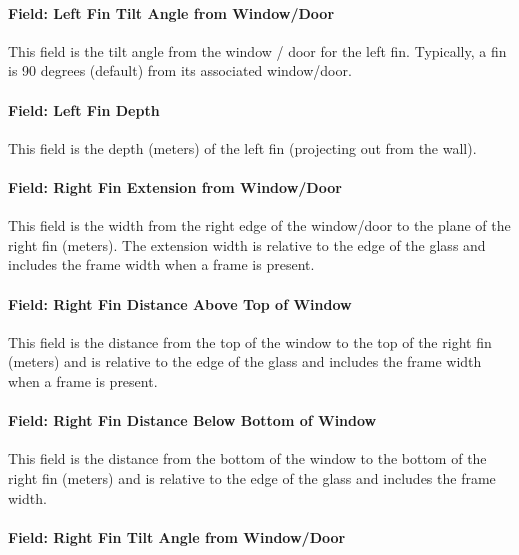 \paragraph{Field: Left Fin Tilt Angle from Window/Door}\label{field-left-fin-tilt-angle-from-windowdoor}

This field is the tilt angle from the window / door for the left fin. Typically, a fin is 90 degrees (default) from its associated window/door.

\paragraph{Field: Left Fin Depth}\label{field-left-fin-depth}

This field is the depth (meters) of the left fin (projecting out from the wall).

\paragraph{Field: Right Fin Extension from Window/Door}\label{field-right-fin-extension-from-windowdoor}

This field is the width from the right edge of the window/door to the plane of the right fin (meters). The extension width is relative to the edge of the glass and includes the frame width when a frame is present.

\paragraph{Field: Right Fin Distance Above Top of Window}\label{field-right-fin-distance-above-top-of-window}

This field is the distance from the top of the window to the top of the right fin (meters) and is relative to the edge of the glass and includes the frame width when a frame is present.

\paragraph{Field: Right Fin Distance Below Bottom of Window}\label{field-right-fin-distance-below-bottom-of-window}

This field is the distance from the bottom of the window to the bottom of the right fin (meters) and is relative to the edge of the glass and includes the frame width.

\paragraph{Field: Right Fin Tilt Angle from Window/Door}\label{field-right-fin-tilt-angle-from-windowdoor}

